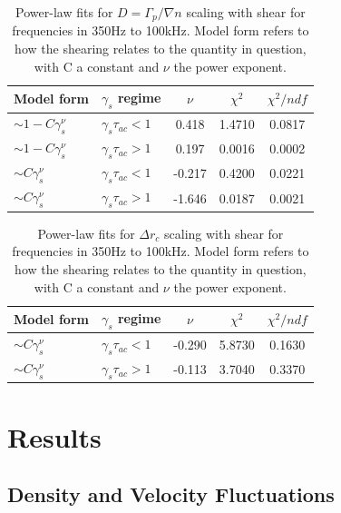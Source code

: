 \documentclass[aip,pop,amsmath,amssymb,preprint,superscriptaddress]{revtex4-1} %
\begin{document}
\begin{table}
\caption{\label{tab:table4}Power-law fits for $D = \Gamma_{p}/\nabla{n}$ scaling with shear for frequencies in 350Hz to 100kHz. Model form refers to how the shearing relates to the quantity in question, with C a constant and $\nu$ the power exponent.}
\begin{ruledtabular}
\begin{tabular}{llccc}
Model form&$\gamma_{s}$ regime&$\nu$&$\chi^2$&$\chi^2/ndf$\\
\hline
$\sim 1-C\gamma_{s}^\nu$&$\gamma_{s}\tau_{ac}<1$ &0.418   &1.4710    &0.0817\\
$\sim 1-C\gamma_{s}^\nu$&$\gamma_{s}\tau_{ac}>1$ &0.197   &0.0016    &0.0002\\
$\sim C\gamma_{s}^\nu$&$\gamma_{s}\tau_{ac}<1$   &-0.217  &0.4200    &0.0221\\
$\sim C\gamma_{s}^\nu$&$\gamma_{s}\tau_{ac}>1$   &-1.646  &0.0187    &0.0021\\
\end{tabular}
\end{ruledtabular}
\end{table}

\begin{table}
\caption{\label{tab:table6}Power-law fits for $\Delta r_{c}$ scaling with shear for frequencies in 350Hz to 100kHz. Model form refers to how the shearing relates to the quantity in question, with C a constant and $\nu$ the power exponent.}
\begin{ruledtabular}
\begin{tabular}{llccc}
Model form&$\gamma_{s}$ regime&$\nu$&$\chi^2$&$\chi^2/ndf$\\
\hline
$\sim C\gamma_{s}^\nu$&$\gamma_{s}\tau_{ac}<1$ &-0.290 &5.8730 &0.1630\\
$\sim C\gamma_{s}^\nu$&$\gamma_{s}\tau_{ac}>1$ &-0.113 &3.7040 &0.3370\\
\end{tabular}
\end{ruledtabular}
\end{table}

\section{Results}

\subsection{Density and Velocity Fluctuations}
\end{document}
